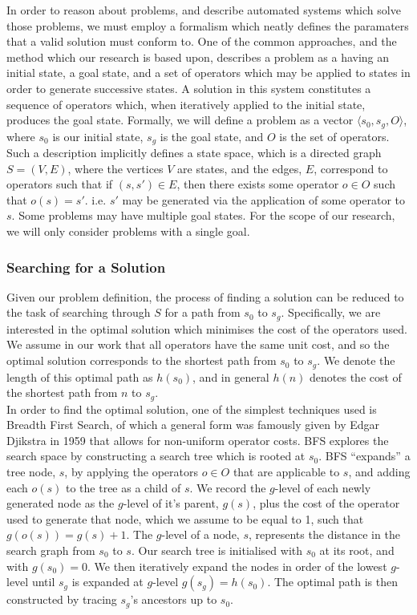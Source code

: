 \documentclass{article}
\begin{document}
In order to reason about problems, and describe automated systems
which solve those problems, we must employ a formalism which neatly defines
the paramaters that a valid solution must conform to.
One of the common approaches, and the method which our research is based upon,
describes a problem as a having an initial state,
a goal state, and a set of operators which may be applied to states in order
to generate successive states.
A solution in this system constitutes a sequence of operators
which, when iteratively applied to the initial state, produces the goal state.
Formally, we will define a problem as a vector \(\langle s_0, s_g, O \rangle\), where
\(s_0\) is our initial state, \(s_g\) is the goal state, and \(O\) is the set of operators.
Such a description implicitly defines a state space, which is a directed graph \(S = ( V, E )\),
where the vertices \(V\) are states, and the edges, \(E\), correspond
to operators such that if \((s,s') \in E\), then there exists some operator \(o \in O\) such that \(o(s) = s'\).
i.e. \(s'\) may be generated via the application of some operator to \(s\).
Some problems may have multiple goal states. For the scope of our research, we will only consider
problems with a single goal.


\subsubsection*{Searching for a Solution}
Given our problem definition, the process of finding a solution can be reduced to the task of searching
through \(S\) for a path from \(s_0\) to \(s_g\).
Specifically, we are interested in the optimal solution which minimises
the cost of the operators used. We assume in our work that all operators
have the same unit cost, and so the optimal solution corresponds to
the shortest path from \(s_0\) to \(s_g\). We denote the length of this optimal path as \(h(s_0)\),
and in general \(h(n)\) denotes the cost of the shortest path from \(n\) to \(s_g\). \\

In order to find the optimal solution, one of the simplest techniques used is Breadth First Search,
of which a general form was famously given by Edgar Djikstra in 1959 \cite{dijkstra1959note}
that allows for non-uniform operator costs.
BFS explores the search space by constructing a search tree which is rooted at \(s_0\).
BFS ``expands'' a tree node, \(s\),
by applying the operators \(o \in O\) that are applicable to \(s\),
and adding each \(o(s)\) to the tree as a child of \(s\).
We record the \(g\)-level of each newly generated node as the \(g\)-level of it's parent, \(g(s)\),
plus the cost of the operator used to generate that node, which we assume to be equal to 1, such that \(g(o(s)) = g(s) + 1\).
The \(g\)-level of a node, \(s\), represents the distance in the search graph from \(s_0\) to \(s\).
Our search tree is initialised with \(s_0\) at its root, and with \(g(s_0) = 0\).
We then iteratively expand the nodes in order of the lowest \(g\)-level until \(s_g\) is expanded
at \(g\)-level \(g(s_g) = h(s_0)\).
The optimal path is then constructed by tracing \(s_g\)'s ancestors up to \(s_0\). \\
\end{document}
